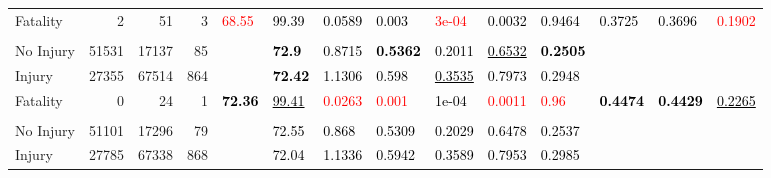\documentclass[]{elsarticle} %
\begin{document}
\begin{table}[!h]
{\begin{tabular}[t]{lrrrllllllllll}
Fatality & 2 & 51 & 3 & \multirow{-3}{*}{\raggedright\arraybackslash \textcolor{red}{68.55}} & \textcolor{black}{99.39} & \textcolor{black}{0.0589} & \textcolor{black}{0.003} & \textcolor{red}{3e-04} & \textcolor{black}{0.0032} & \textcolor{black}{0.9464} & \multirow{-3}{*}{\raggedright\arraybackslash \textcolor{black}{0.3725}} & \multirow{-3}{*}{\raggedright\arraybackslash \textcolor{black}{0.3696}} & \multirow{-3}{*}{\raggedright\arraybackslash \textcolor{red}{0.1902}}\\
\cmidrule{1-14}
\addlinespace[0.3em]
\multicolumn{14}{l}{\textbf{Model 2}}\\
\hspace{1em}No Injury & 51531 & 17137 & 85 &  & \textcolor{black}{\textbf{72.9}} & \textcolor{black}{0.8715} & \textcolor{black}{\textbf{0.5362}} & \textcolor{black}{0.2011} & \textcolor{black}{\underline{0.6532}} & \textcolor{black}{\textbf{0.2505}} &  &  & \\

\hspace{1em}Injury & 27355 & 67514 & 864 &  & \textcolor{black}{\textbf{72.42}} & \textcolor{black}{1.1306} & \textcolor{black}{0.598} & \textcolor{black}{\underline{0.3535}} & \textcolor{black}{0.7973} & \textcolor{black}{0.2948} &  &  & \\

Fatality & 0 & 24 & 1 & \multirow{-3}{*}{\raggedright\arraybackslash \textcolor{black}{\textbf{72.36}}} & \textcolor{black}{\underline{99.41}} & \textcolor{red}{0.0263} & \textcolor{red}{0.001} & \textcolor{black}{1e-04} & \textcolor{red}{0.0011} & \textcolor{red}{0.96} & \multirow{-3}{*}{\raggedright\arraybackslash \textcolor{black}{\textbf{0.4474}}} & \multirow{-3}{*}{\raggedright\arraybackslash \textcolor{black}{\textbf{0.4429}}} & \multirow{-3}{*}{\raggedright\arraybackslash \textcolor{black}{\underline{0.2265}}}\\
\cmidrule{1-14}
\addlinespace[0.3em]
\multicolumn{14}{l}{\textbf{Model 3}}\\
\hspace{1em}No Injury & 51101 & 17296 & 79 &  & \textcolor{black}{72.55} & \textcolor{black}{0.868} & \textcolor{black}{0.5309} & \textcolor{black}{0.2029} & \textcolor{black}{0.6478} & \textcolor{black}{0.2537} &  &  & \\

\hspace{1em}Injury & 27785 & 67338 & 868 &  & \textcolor{black}{72.04} & \textcolor{black}{1.1336} & \textcolor{black}{0.5942} & \textcolor{black}{0.3589} & \textcolor{black}{0.7953} & \textcolor{black}{0.2985} &  &  & \\


\end{tabular}}
\end{table}
\end{document}
